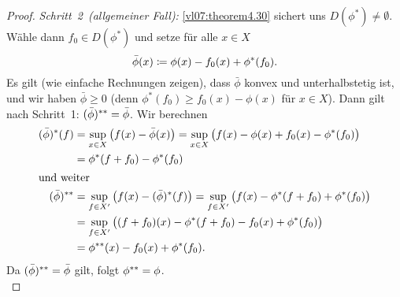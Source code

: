 \begin{proof}
    \emph{Schritt~2~(allgemeiner Fall):} \cref{vl07:theorem4.30} sichert uns
    $D(\phi^\ast)\neq\emptyset$. Wähle dann $f_0\in D(\phi^\ast)$ und setze
    für alle $x\in X$
    \[ \bar\phi(x) \coloneqq \phi(x) - f_0(x) + \phi^\ast(f_0)  . \]
    Es gilt (wie einfache Rechnungen zeigen), dass $\bar\phi$ konvex und
    unterhalbstetig ist, und wir haben $\bar\phi\geq 0$ (denn
    $\phi^\ast(f_0)\geq f_0(x)-\phi(x)$ für $x\in X$). Dann gilt nach Schritt~1:
    $(\bar\phi)^{\ast\ast} = \bar\phi$. Wir berechnen
    \begin{align*}
        (\bar\phi)^\ast(f)
        &= \sup_{x\in X} \, \bigl( f(x) - \bar\phi(x) \bigr)
         = \sup_{x\in X} \, \bigl( f(x) - \phi(x) + f_0(x) - \phi^\ast(f_0) \bigr)
        \\
        &= \phi^\ast(f+f_0) - \phi^\ast(f_0)
        \\
        \shortintertext{und weiter}
        (\bar\phi)^{\ast\ast} 
        &= \sup_{f\in X'} \, \bigl( f(x) - (\bar\phi)^\ast(f) \bigr)
         = \sup_{f\in X'} \, \bigl( f(x) - \phi^\ast(f+f_0) + \phi^\ast(f_0) \bigr)
        \\
        &= \sup_{f\in X'} \, \bigl( (f+f_0)(x) - \phi^\ast(f+f_0) 
            - f_0(x) + \phi^\ast(f_0) \bigr)
        \\
        &= \phi^{\ast\ast}(x) - f_0(x) + \phi^\ast(f_0)
    . \end{align*}
    Da $(\bar\phi)^{\ast\ast} = \bar\phi$ gilt, folgt $\phi^{\ast\ast} = \phi$.
    \\
\end{proof}

